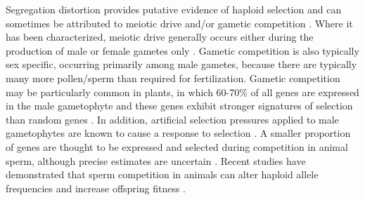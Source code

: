 \documentclass[12pt]{article}
\begin{document}
Segregation distortion provides putative evidence of haploid selection and can sometimes be attributed to meiotic drive and/or gametic competition \citep{Lalanne2004,Fishman2005,Leppala2008,Leppala2013,Didion2015,Didion2016}.
Where it has been characterized, meiotic drive generally occurs either during the production of male or female gametes only \citep{Ubeda:2005gw,Lindholm:2016cw}.
Gametic competition is also typically sex specific, occurring primarily among male gametes, because there are typically many more pollen/sperm than required for fertilization.
Gametic competition may be particularly common in plants, in which 60-70\% of all genes are expressed in the male gametophyte and these genes exhibit stronger signatures of selection than random genes \citep{Borg:2009jpa,Arunkumar:2013iq,Gossmann:2014dua}.
In addition, artificial selection pressures applied to male gametophytes are known to cause a response to selection \citep[e.g.,][]{Hormaza:1996cv,Ravikumar:2003uo,Hedhly:2004iv,Clarke:2004ir}. 
A smaller proportion of genes are thought to be expressed and selected during competition in animal sperm, although precise estimates are uncertain \citep{Zheng:2001fi,JOSEPH:2004haa,Vibranovski:2010et}. 
Recent studies have demonstrated that sperm competition in animals can alter haploid allele frequencies and increase offspring fitness \citep{Immler:2014im,Alavioon2017}.
\end{document}

